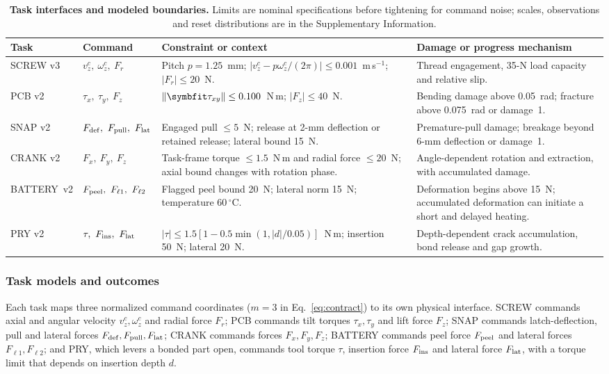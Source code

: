 \documentclass[12pt]{article}
\begin{document}
\begin{table}[!ht]
\centering\small
\caption{\textbf{Task interfaces and modeled boundaries.} Limits are nominal
specifications before tightening for command noise; scales, observations and
reset distributions are in the Supplementary Information.}
\label{tab:submitted-2}
\setlength{\tabcolsep}{5pt}
\renewcommand{\arraystretch}{1.12}
\begin{tabular}{@{}L{0.86in}L{1.12in}L{2.28in}L{1.80in}@{}}
\toprule
Task & Command & Constraint or context & Damage or progress mechanism\\
\midrule
SCREW v3 & $v_z^c,\ \omega_z^c,\ F_r$ & Pitch $p=1.25$~mm; $|v_z^c-p\omega_z^c/(2\pi)|\leq0.001$~m\,s$^{-1}$; $|F_r|\leq20$~N. & Thread engagement, 35-N load capacity and relative slip.\\
\addlinespace
PCB v2 & $\tau_x,\ \tau_y,\ F_z$ & $\|\symbfit\tau_{xy}\|\leq0.100$~N\,m; $|F_z|\leq40$~N. & Bending damage above 0.05~rad; fracture above 0.075~rad or damage~1.\\
\addlinespace
SNAP v2 & $F_{\rm def},\ F_{\rm pull},\ F_{\rm lat}$ & Engaged pull $\leq5$~N; release at 2-mm deflection or retained release; lateral bound 15~N. & Premature-pull damage; breakage beyond 6-mm deflection or damage~1.\\
\addlinespace
CRANK v2 & $F_x,\ F_y,\ F_z$ & Task-frame torque $\leq1.5$~N\,m and radial force $\leq20$~N; axial bound changes with rotation phase. & Angle-dependent rotation and extraction, with accumulated damage.\\
\addlinespace
\mbox{BATTERY v2} & $F_{\rm peel},\ F_{\ell1},\ F_{\ell2}$ & Flagged peel bound 20~N; lateral norm 15~N; temperature 60\,$^\circ$C. & Deformation begins above 15~N; accumulated deformation can initiate a short and delayed heating.\\
\addlinespace
PRY v2 & $\tau,\ F_{\rm ins},\ F_{\rm lat}$ & $|\tau|\leq1.5[1-0.5\min(1,|d|/0.05)]$~N\,m; insertion 50~N; lateral 20~N. & Depth-dependent crack accumulation, bond release and gap growth.\\
\bottomrule
\end{tabular}
\end{table}


\subsubsection{Task models and outcomes}
\label{sec:tasks}
Each task maps three normalized command coordinates ($m=3$ in
Eq.~\eqref{eq:contract}) to its own physical interface. SCREW commands axial
and angular velocity $v_z^c,\omega_z^c$ and radial force $F_r$; PCB commands
tilt torques $\tau_x,\tau_y$ and lift force $F_z$; SNAP commands
latch-deflection, pull and lateral forces $F_{\rm def},F_{\rm pull},F_{\rm
lat}$; CRANK commands forces $F_x,F_y,F_z$; BATTERY commands peel force $F_{\rm
peel}$ and lateral forces $F_{\ell1},F_{\ell2}$; and PRY, which levers a bonded
part open, commands tool torque $\tau$, insertion force $F_{\rm ins}$ and
lateral force $F_{\rm lat}$, with a torque limit that depends on insertion
depth $d$.
\end{document}
